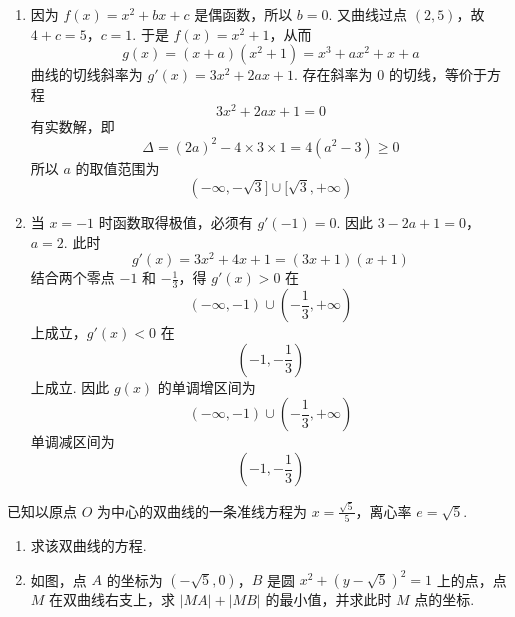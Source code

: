\begin{solution}
\begin{enumerate}
\item 因为 \(f(x)=x^2+bx+c\) 是偶函数，所以 \(b=0\). 又曲线过点 \((2,5)\)，故
\(4+c=5\)，\(c=1\).
于是 \(f(x)=x^2+1\)，从而
\[
g(x)=(x+a)(x^2+1)=x^3+ax^2+x+a
\]
曲线的切线斜率为 \(g'(x)=3x^2+2ax+1\). 存在斜率为 \(0\) 的切线，等价于方程
\[
3x^2+2ax+1=0
\]
有实数解，即
\[
\Delta=(2a)^2-4\times3\times1=4(a^2-3)\geqslant0
\]
所以 \(a\) 的取值范围为
\[
(-\infty,-\sqrt3]\cup[\sqrt3,+\infty)
\]

\item 当 \(x=-1\) 时函数取得极值，必须有 \(g'(-1)=0\). 因此
\(3-2a+1=0\)，\(a=2\).
此时
\[
g'(x)=3x^2+4x+1=(3x+1)(x+1)
\]
结合两个零点 \(-1\) 和 \(-\frac13\)，得 \(g'(x)>0\) 在
\[
(-\infty,-1)\cup\left(-\frac13,+\infty\right)
\]
上成立，\(g'(x)<0\) 在
\[
\left(-1,-\frac13\right)
\]
上成立. 因此 \(g(x)\) 的单调增区间为
\[
(-\infty,-1)\cup\left(-\frac13,+\infty\right)
\]
单调减区间为
\[
\left(-1,-\frac13\right)
\]
\end{enumerate}
\end{solution}

\begin{problem}
已知以原点 \(O\) 为中心的双曲线的一条准线方程为 \(x = \frac{\sqrt{5}}{5}\)，离心率 \(e = \sqrt{5}\).
\begin{enumerate}
\item 求该双曲线的方程.
\item 如图，点 \(A\) 的坐标为 \((- \sqrt{5}, 0)\)，\(B\) 是圆 \(x^{2} + (y - \sqrt{5})^{2} = 1\) 上的点，点 \(M\) 在双曲线右支上，求 \(|MA| + |MB|\) 的最小值，并求此时 \(M\) 点的坐标.
\end{enumerate}

\end{problem}

